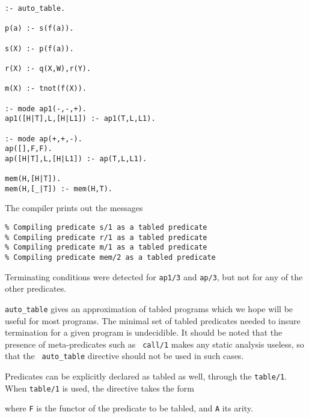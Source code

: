 \begin{center}
\begin{verbatim}
:- auto_table. 

p(a) :- s(f(a)). 

s(X) :- p(f(a)).

r(X) :- q(X,W),r(Y).

m(X) :- tnot(f(X)).

:- mode ap1(-,-,+).
ap1([H|T],L,[H|L1]) :- ap1(T,L,L1).

:- mode ap(+,+,-).
ap([],F,F).
ap([H|T],L,[H|L1]) :- ap(T,L,L1).

mem(H,[H|T]).
mem(H,[_|T]) :- mem(H,T).
\end{verbatim}
\end{center}

\noindent
The compiler prints out the messages
\begin{verbatim}
% Compiling predicate s/1 as a tabled predicate
% Compiling predicate r/1 as a tabled predicate
% Compiling predicate m/1 as a tabled predicate
% Compiling predicate mem/2 as a tabled predicate
\end{verbatim}

Terminating conditions were detected for {\tt ap1/3} and {\tt ap/3}, but
not for any of the other predicates.

{\tt auto\_table} gives an approximation of tabled programs which we
hope will be useful for most programs.  The minimal set of tabled
predicates needed to insure termination for a given program is
undecidible.  
It should be noted that the presence of meta-predicates such as {\tt
call/1} makes any static analysis useless, so that the {\tt
auto\_table} directive should not be used in such cases.

Predicates can be explicitly declared as tabled as well, through the
{\tt table/1}.  When {\tt table/1} is used, the directive takes the
form


\noindent
where {\tt F} is the functor of the predicate to be tabled, and {\tt A} its
arity.  

